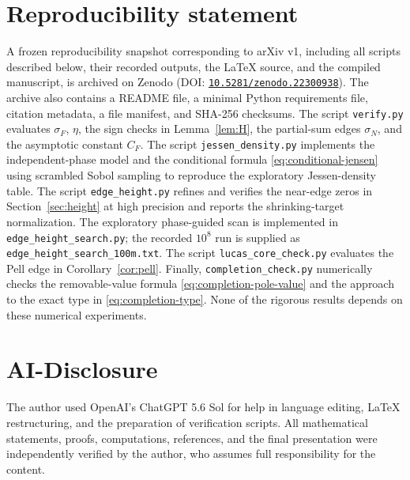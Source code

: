 \documentclass[11pt]{article}
\theoremstyle{remark}
\newcommand{\ZenodoDOI}{10.5281/zenodo.22300938}
\begin{document}
\section*{Reproducibility statement}
A frozen reproducibility snapshot corresponding to arXiv v1, including all scripts described below, their recorded outputs, the LaTeX source, and the compiled manuscript, is archived on Zenodo (DOI: \href{https://doi.org/\ZenodoDOI}{\texttt{\ZenodoDOI}}).  The archive also contains a README file, a minimal Python requirements file, citation metadata, a file manifest, and SHA-256 checksums.  The script \texttt{verify.py} evaluates $\sigma_F$, $\eta$, the sign checks in Lemma~\ref{lem:H}, the partial-sum edges $\sigma_N$, and the asymptotic constant $C_F$.  The script \texttt{jessen\_density.py} implements the independent-phase model and the conditional formula \eqref{eq:conditional-jensen} using scrambled Sobol sampling to reproduce the exploratory Jessen-density table.  The script \texttt{edge\_height.py} refines and verifies the near-edge zeros in Section~\ref{sec:height} at high precision and reports the shrinking-target normalization.  The exploratory phase-guided scan is implemented in \texttt{edge\_height\_search.py}; the recorded $10^8$ run is supplied as \texttt{edge\_height\_search\_100m.txt}.  The script \texttt{lucas\_core\_check.py} evaluates the Pell edge in Corollary~\ref{cor:pell}.  Finally, \texttt{completion\_check.py} numerically checks the removable-value formula \eqref{eq:completion-pole-value} and the approach to the exact type in \eqref{eq:completion-type}.  None of the rigorous results depends on these numerical experiments.

\section*{AI-Disclosure}
The author used OpenAI's ChatGPT 5.6 Sol for help in language editing, LaTeX restructuring, and the preparation of verification scripts.  All mathematical statements, proofs, computations, references, and the final presentation were independently verified by the author, who assumes full responsibility for the content.
\end{document}
